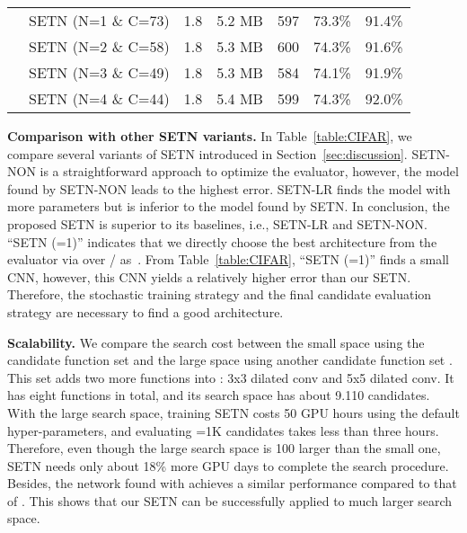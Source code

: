 \documentclass[10pt,twocolumn,letterpaper]{article}
\def\Tabref#1{Table~\ref{#1}}
\def\Secref#1{Section~\ref{#1}}
\def\NAME{{SETN}}
\begin{document}
\begin{table*}[t!]
\begin{tabular}{| c | l | c | c | c | c | c |}
 & {\NAME} (N=1 \& C=73)                            & 1.8  & 5.2 MB   &    597        &    73.3\%      & 91.4\%  \\
 & {\NAME} (N=2 \& C=58)                            & 1.8  & 5.3 MB   &    600        &    74.3\%      & 91.6\%  \\
 & {\NAME} (N=3 \& C=49)                            & 1.8  & 5.3 MB   &    584        &    74.1\%      & 91.9\%  \\
 & {\NAME} (N=4 \& C=44)                            & 1.8  & 5.4 MB   &    599        &    74.3\%      & 92.0\%  \\
\hline
\end{tabular}
\vspace{2mm}
\caption{
We compare networks found by {\NAME} and other approaches on ImageNet.
We report the model size, the computation cost, the top-1 accuracy, and the top-5 accuracy.
The top block shows the manually designed CNNs. The bottom two blocks indicate the automatically design CNNs.
 indicates the number of multiply-add operations.
}
\vspace{-2mm}
\label{table:ImageNet}
\end{table*}



{\bf Comparison with other {\NAME} variants.}
In \Tabref{table:CIFAR}, we compare several variants of {\NAME} introduced in \Secref{sec:discussion}.
{\NAME}-NON is a straightforward approach to optimize the evaluator, however, the model found by {\NAME}-NON leads to the highest error.
{\NAME}-LR finds the model with more parameters but is inferior to the model found by {\NAME}.
In conclusion, the proposed {\NAME} is superior to its baselines, i.e., {\NAME}-LR and {\NAME}-NON.
``{\NAME} (=1)'' indicates that we directly choose the best architecture from the evaluator via  over / as~\cite{liu2019darts}.
From \Tabref{table:CIFAR}, ``{\NAME} (=1)'' finds a small CNN, however, this CNN yields a relatively higher error than our {\NAME}.
Therefore, the stochastic training strategy and the final candidate evaluation strategy are necessary to find a good architecture.





{\bf Scalability.}
We compare the search cost between the small space using the candidate function set  and the large space using another candidate function set .
This set  adds two more functions into : 3x3 dilated conv and 5x5 dilated conv.
It has eight functions in total, and its search space has about 9.110 candidates.
With the large search space, training {\NAME} costs 50 GPU hours using the default hyper-parameters, and evaluating =1K candidates takes less than three hours.
Therefore, even though the large search space is 100 larger than the small one, {\NAME} needs only about 18\% more GPU days to complete the search procedure.
Besides, the network found with  achieves a similar performance compared to that of . This shows that our {\NAME} can be successfully applied to much larger search space.
\end{document}
